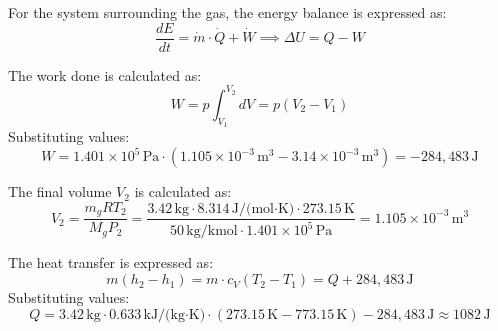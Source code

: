 For the system surrounding the gas, the energy balance is expressed as:  
\[
\frac{dE}{dt} = \dot{m} \cdot \dot{Q} + \dot{W} \implies \Delta U = Q - W
\]  

The work done is calculated as:  
\[
W = p \int_{V_1}^{V_2} dV = p(V_2 - V_1)
\]  
Substituting values:  
\[
W = 1.401 \times 10^5 \, \text{Pa} \cdot (1.105 \times 10^{-3} \, \text{m}^3 - 3.14 \times 10^{-3} \, \text{m}^3) = -284,483 \, \text{J}
\]  

The final volume \( V_2 \) is calculated as:  
\[
V_2 = \frac{m_g R T_2}{M_g P_2} = \frac{3.42 \, \text{kg} \cdot 8.314 \, \text{J/(mol·K)} \cdot 273.15 \, \text{K}}{50 \, \text{kg/kmol} \cdot 1.401 \times 10^5 \, \text{Pa}} = 1.105 \times 10^{-3} \, \text{m}^3
\]  

The heat transfer is expressed as:  
\[
m(h_2 - h_1) = m \cdot c_V (T_2 - T_1) = Q + 284,483 \, \text{J}
\]  
Substituting values:  
\[
Q = 3.42 \, \text{kg} \cdot 0.633 \, \text{kJ/(kg·K)} \cdot (273.15 \, \text{K} - 773.15 \, \text{K}) - 284,483 \, \text{J} \approx 1082 \, \text{J}
\]